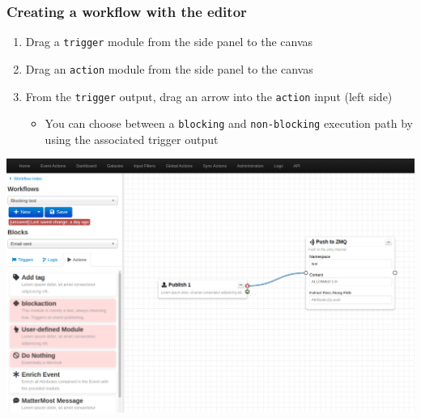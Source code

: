 \begin{frame}
    \frametitle{Creating a workflow with the editor}
    \begin{enumerate}
        \item Drag a \texttt{trigger} module from the side panel to the canvas
        \item Drag an \texttt{action} module from the side panel to the canvas
        \item From the \texttt{trigger} output, drag an arrow into the \texttt{action} input (left side)
        \begin{itemize}
            \item You can choose between a \texttt{blocking} and \texttt{non-blocking} execution path by using the associated trigger output
        \end{itemize}
    \end{enumerate}
    \begin{center}
        \includegraphics[width=1.0\linewidth]{pictures/editor-1.png}
    \end{center}
\end{frame}

